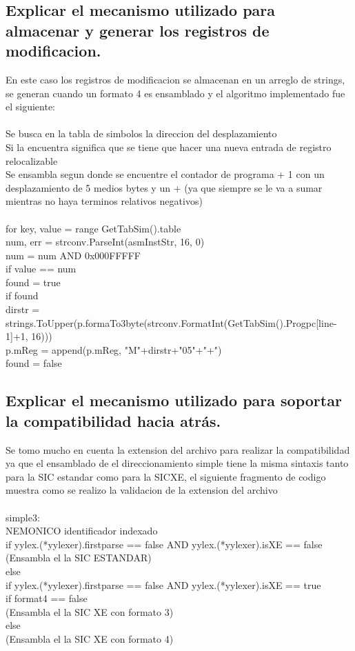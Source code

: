 \documentclass[10pt,letterpaper,oneside]{article}
\begin{document}
\subsection{Explicar el mecanismo utilizado para almacenar y generar los registros de modificacion.}
En este caso los registros de modificacion se almacenan en un arreglo de strings, se generan cuando un formato 4 es ensamblado y el algoritmo implementado fue el siguiente:\\
\\
Se busca en la tabla de simbolos la direccion del desplazamiento\\
Si la encuentra significa que se tiene que hacer una nueva entrada de registro relocalizable\\
Se ensambla segun donde se encuentre el contador de programa + 1 con un desplazamiento de 5 medios bytes y un + (ya que siempre se le va a sumar mientras no haya terminos relativos negativos)\\
\\
for key, value = range GetTabSim().table \\
		num, err = strconv.ParseInt(asmInstStr, 16, 0)\\
		num = num AND 0x000FFFFF\\
		if value == num \\
			found = true\\
			if found \\
					dirstr = strings.ToUpper(p.formaTo3byte(strconv.FormatInt(GetTabSim().Progpc[line-1]+1, 16)))\\
					p.mReg = append(p.mReg, "M"+dirstr+"05"+"+")\\
				found = false\\
		
\subsection{Explicar el mecanismo utilizado para soportar la compatibilidad hacia atr\'as.}
Se tomo mucho en cuenta la extension del archivo para realizar la compatibilidad ya que el ensamblado de el direccionamiento simple tiene la misma sintaxis tanto para la SIC estandar como para la SICXE, el siguiente fragmento de codigo muestra como se realizo la validacion de la extension del archivo\\
\\
	simple3:\\
			NEMONICO identificador indexado \\
					if yylex.(*yylexer).firstparse == false AND yylex.(*yylexer).isXE == false	\\
						(Ensambla el la SIC ESTANDAR)\\
					 else\\
							if yylex.(*yylexer).firstparse == false AND yylex.(*yylexer).isXE == true	\\
								if format4 == false\\
								(Ensambla el la SIC XE con formato 3)\\
								else\\
								(Ensambla el la SIC XE con formato 4)\\				
\end{document}
